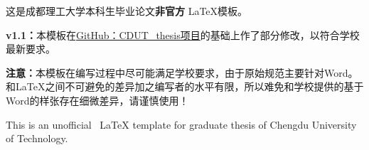 \documentclass{cdut_thesis}
\begin{document}
\fronthead
\makezhcover

\begin{chineseabstract}
这是成都理工大学本科生毕业论文\textbf{非官方} \LaTeX 模板。
	
\textbf{v1.1：}本模板在\href{https://github.com/cs-whh/CDUT_thesis}{\color{red}GitHub：CDUT\_thesis项目}的基础上作了部分修改，以符合学校最新要求。
	
\textbf{注意：}本模板在编写过程中尽可能满足学校要求，由于原始规范主要针对Word。和\LaTeX 之间不可避免的差异加之编写者的水平有限，所以难免和学校提供的基于Word的样张存在细微差异，请谨慎使用！
\end{chineseabstract}



\begin{englishabstract}
This is an unofficial \ LaTeX template for graduate thesis of Chengdu University of Technology.
\end{englishabstract}


\newpage

\tableofcontents

\newpage
\texthead









\end{document}
